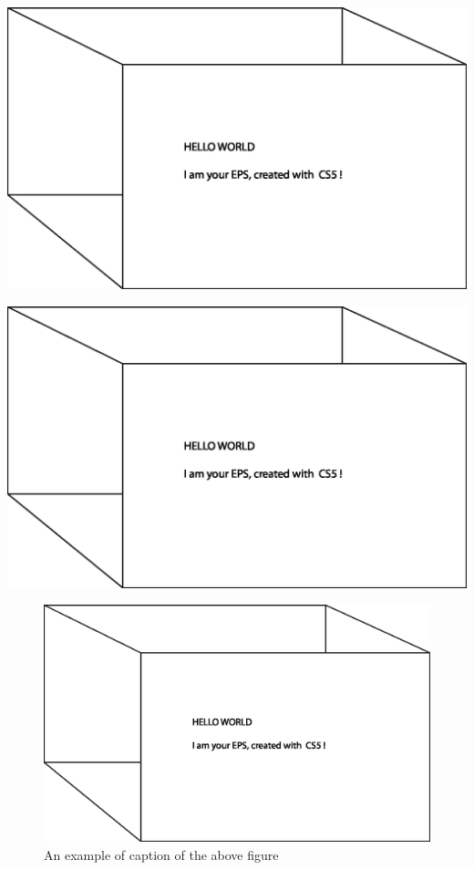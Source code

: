 \documentclass[11pt]{article}
\begin{document}
 
\begin{minipage}[c]{0.45\textwidth}
\includegraphics[width=\linewidth]{bild-01.eps}
\end{minipage}
\hspace{0.5cm}
\begin{minipage}[c]{0.45\textwidth}
\includegraphics[width=\linewidth]{bild-01.eps}
\end{minipage}
 
 
 
 
\clearpage
\begin{figure}
\includegraphics[width=\linewidth]{bild-01.eps}
\caption{An example of caption of the above figure}
\end{figure}
\end{document}
